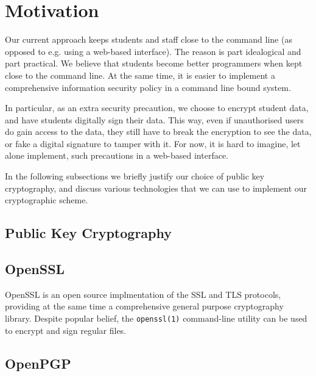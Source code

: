 
\section{Motivation}

Our current approach keeps students and staff close to the command line (as
opposed to e.g. using a web-based interface). The reason is part idealogical
and part practical. We believe that students become better programmers when
kept close to the command line. At the same time, it is easier to implement a
comprehensive information security policy in a command line bound system.

In particular, as an extra security precaution, we choose to encrypt student
data, and have students digitally sign their data. This way, even if
unauthorised users do gain access to the data, they still have to break the
encryption to see the data, or fake a digital signature to tamper with it.  For
now, it is hard to imagine, let alone implement, such precautions in a
web-based interface.

In the following subsections we briefly justify our choice of public key
cryptography, and discuss various technologies that we can use to implement our
cryptographic scheme.

\subsection{Public Key Cryptography}

\subsection{OpenSSL}

OpenSSL is an open source implmentation of the SSL and TLS protocols, providing
at the same time a comprehensive general purpose cryptography
library\cite{openssl-org-2014}. Despite popular belief, the \texttt{openssl(1)}
command-line utility can be used to encrypt and sign regular files.

\subsection{OpenPGP}
